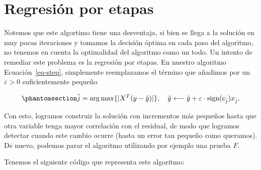 \documentclass[
  letterpaper,
  DIV=11,
  numbers=noendperiod]{scrreprt}
\theoremstyle{plain}
\theoremstyle{definition}
\theoremstyle{remark}
\begin{document}
\section{Regresión por etapas}\label{regresiuxf3n-por-etapas}

Notemos que este algortimo tiene una desventaja, si bien se llega a la
solución en muy pocas iteraciones y tomamos la decisión óptima en cada
paso del algoritmo, no tenemos en cuenta la optimalidad del algoritmo
como un todo. Un intento de remediar este problema es la regresión por
etapas. En nuestro algoritmo Ecuación~\ref{eq-step}, simplemente
reemplazamos el término que añadimos por un \(\varepsilon>0\)
suficientemente pequeño

\begin{equation}\phantomsection\label{eq-stage}{
\hat j =\arg\max \{|X^T(y-\hat y)|\},\quad \hat y \longleftarrow \hat y+\varepsilon\cdot\text{sign}(c_{\hat j}) x_{\hat j}.
}\end{equation}

Con esto, logramos construir la solución con incrementos más pequeños
hasta que otra variable tenga mayor correlación con el residual, de modo
que logramos detectar cuando este cambio ocurre (hasta un error tan
pequeño como queramos). De nuevo, podemos parar el algoritmo utilizando
por ejemplo una prueba \(F\).

Tenemos el siguiente código que representa este algoritmo:
\end{document}
